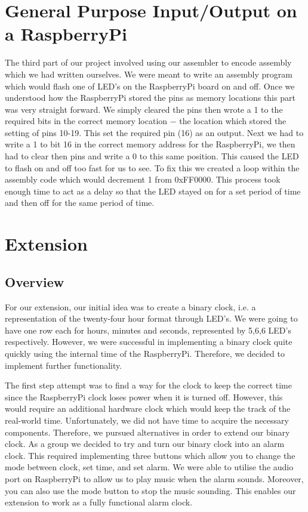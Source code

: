 \documentclass[11pt]{article}
\begin{document}
\section{General Purpose Input/Output on a RaspberryPi}
The third part of our project involved using our assembler to encode assembly which we had written ourselves. We were meant to write an assembly program which would flash one of LED’s on the RaspberryPi board on and off. Once we understood how the RaspberryPi stored the pins as memory locations this part was very straight forward. We simply cleared the pins then wrote a 1 to the required bits in the correct memory location $-$ the location which stored the setting of pins 10-19. This set the required pin (16) as an output. Next we had to write a 1 to bit 16 in the correct memory address for the RaspberryPi, we then had to clear then pins and write a 0 to this same position. This caused the LED to flash on and off too fast for us to see. To fix this we created a loop within the assembly code which would decrement 1 from 0xFF0000. This process took enough time to act as a delay so that the LED stayed on for a set period of time and then off for the same period of time.

\section{Extension}
\subsection{Overview}
For our extension, our initial idea was to create a binary clock, i.e. a representation of the twenty-four hour format through LED’s. We were going to have one row each for hours, minutes and seconds, represented by 5,6,6 LED's respectively. However, we were successful in implementing a binary clock quite quickly using the internal time of the RaspberryPi. Therefore, we decided to implement further functionality. 

The first step attempt was to find a way for the clock to keep the correct time since the RaspberryPi clock loses power when it is turned off. However, this would require an additional hardware clock which would keep the track of the real-world time. Unfortunately, we did not have time to acquire the necessary components. Therefore, we pursued alternatives in order to extend our binary clock. As a group we decided to try and turn our binary clock into an alarm clock. This required implementing three buttons which allow you to change the mode between clock, set time, and set alarm. We were able to utilise the audio port on RaspberryPi to allow us to play music when the alarm sounds. Moreover, you can also use the mode button to stop the music sounding. This enables our extension to work as a fully functional alarm clock.
\end{document}
